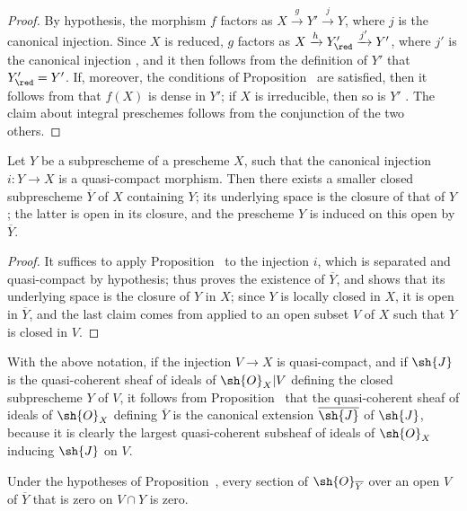 \begin{proof}
By hypothesis, the morphism $f$ factors as $X\xrightarrow{g}Y'\xrightarrow{j}Y$, where $j$ is the canonical injection.
Since $X$ is reduced, $g$ factors as $X\xrightarrow{h}Y'_\red\xrightarrow{j'}Y'$, where $j'$ is the canonical injection , and it then follows from the definition of $Y'$ that $Y'_\red=Y'$.
If, moreover, the conditions of Proposition~ are satisfied, then it follows from  that $f(X)$ is dense in $Y'$; if $X$ is irreducible, then so is $Y'$ .
The claim about integral preschemes follows from the conjunction of the two others.
\end{proof}

\begin{proposition}[9.5.10]
\label{I.9.5.10}
Let $Y$ be a subprescheme of a prescheme $X$, such that the canonical injection $i:Y\to X$ is a quasi-compact morphism.
Then there exists a smaller closed subprescheme $\overline{Y}$ of $X$ containing $Y$; its underlying space is the closure of that of $Y$; the latter is open in its closure, and the prescheme $Y$ is induced on this open by $\overline{Y}$.
\end{proposition}

\begin{proof}
It suffices to apply Proposition~ to the injection $i$, which is separated  and quasi-compact by hypothesis;  thus proves the existence of $\overline{Y}$, and  shows that its underlying space is the closure of $Y$ in $X$; since $Y$ is locally closed in $X$, it is open in $\overline{Y}$, and the last claim comes from  applied to an open subset $V$ of $X$ such that $Y$ is closed in $V$.
\end{proof}

With the above notation, if the injection $V\to X$ is quasi-compact, and if $\sh{J}$ is the quasi-coherent sheaf of ideals of $\sh{O}_X|V$ defining the closed subprescheme $Y$ of $V$, it follows from Proposition~ that the quasi-coherent sheaf of ideals of $\sh{O}_X$ defining $\overline{Y}$ is the canonical extension  $\overline{\sh{J}}$ of $\sh{J}$, because it is clearly the largest quasi-coherent subsheaf of ideals of $\sh{O}_X$ inducing $\sh{J}$ on $V$.

\begin{corollary}[9.5.11]
\label{I.9.5.11}
Under
the hypotheses of Proposition~, every section of $\sh{O}_{\overline{Y}}$ over an open $V$ of $\overline{Y}$ that is zero on $V\cap Y$ is zero.
\end{corollary}

